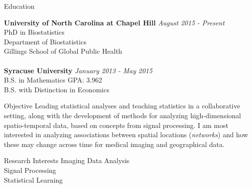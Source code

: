 \documentclass{resume} %
\begin{document}

\begin{rSection}{Education}

{\bf University of North Carolina at Chapel Hill} \hfill {\em August 2015 - Present} 
\\ PhD in Biostatistics
\\ Department of Biostatistics
\\ Gillings School of Global Public Health\\
\\{\bf Syracuse University} \hfill {\em January 2013 - May 2015} 
\\ B.S. in Mathematics\hfill { GPA: 3.962}
\\ B.S. with Distinction in Economics

\end{rSection}


\begin{rSection}{Objective}
Leading statistical analyses and teaching statistics in a collaborative setting, along with the development of methods for analyzing high-dimensional spatio-temporal data, based on concepts from signal processing.  I am most interested in analyzing associations between spatial locations (\textit{networks}) and how these may change across time for medical imaging and geographical data.
\end{rSection}


\begin{rSection}{Research Interests}
Imaging Data Analysis\\
Signal Processing\\
Statistical Learning\\
\end{rSection}
\end{document}
